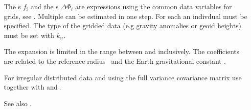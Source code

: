 The s $f_i$ and the s $\Delta\Phi_i$ are expressions
using the common data variables for grids, see .
Multiple  can be estimated in one step.
For each an indivdual  must be specified.
The type of the gridded data (e.g gravity anomalies or geoid heights)
must be set with  $k_n$.

The expansion is limited in the range between 
and  inclusively. The coefficients are related
to the reference radius~ and the Earth gravitational constant .

For irregular distributed data and using the full variance covariance matrix use
 together with 
and .

See also .


